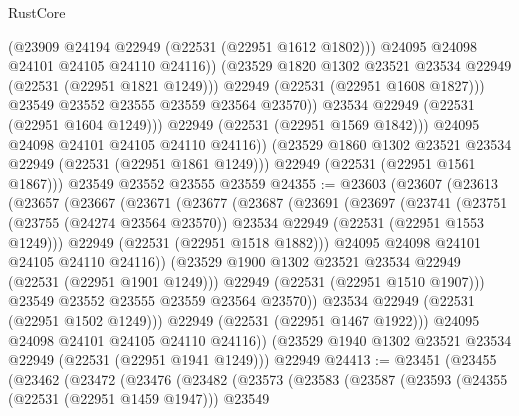 \begin{lexlean}{RustCore}
\begin{coremodule}
                        (@23909 @24194 @22949 (@22531 (@22951 @1612 @1802)))
                        @24095
                        @24098
                        @24101
                        @24105
                        @24110
                        @24116))
                    (@23529 @1820 @1302 @23521 @23534 @22949 (@22531 (@22951 @1821 @1249)))
                    @22949
                    (@22531 (@22951 @1608 @1827)))
                  @23549
                  @23552
                  @23555
                  @23559
                  @23564
                  @23570))
              @23534
              @22949
              (@22531 (@22951 @1604 @1249)))
            @22949
            (@22531 (@22951 @1569 @1842)))
          @24095
          @24098
          @24101
          @24105
          @24110
          @24116))
      (@23529 @1860 @1302 @23521 @23534 @22949 (@22531 (@22951 @1861 @1249)))
      @22949
      (@22531 (@22951 @1561 @1867)))
    @23549
    @23552
    @23555
    @23559
@24355 := @23603
    (@23607
      (@23613
        (@23657
          (@23667
            (@23671
              (@23677
                (@23687
                  (@23691
                    (@23697
                      (@23741
                        (@23751
                          (@23755 (@24274 @23564 @23570))
                          @23534
                          @22949
                          (@22531 (@22951 @1553 @1249)))
                        @22949
                        (@22531 (@22951 @1518 @1882)))
                      @24095
                      @24098
                      @24101
                      @24105
                      @24110
                      @24116))
                  (@23529 @1900 @1302 @23521 @23534 @22949 (@22531 (@22951 @1901 @1249)))
                  @22949
                  (@22531 (@22951 @1510 @1907)))
                @23549
                @23552
                @23555
                @23559
                @23564
                @23570))
            @23534
            @22949
            (@22531 (@22951 @1502 @1249)))
          @22949
          (@22531 (@22951 @1467 @1922)))
        @24095
        @24098
        @24101
        @24105
        @24110
        @24116))
    (@23529 @1940 @1302 @23521 @23534 @22949 (@22531 (@22951 @1941 @1249)))
    @22949
@24413 := @23451
    (@23455
      (@23462
        (@23472
          (@23476
            (@23482
              (@23573
                (@23583
                  (@23587
                    (@23593
                      (@24355 (@22531 (@22951 @1459 @1947)))
                      @23549

\end{coremodule}
\end{lexlean}
